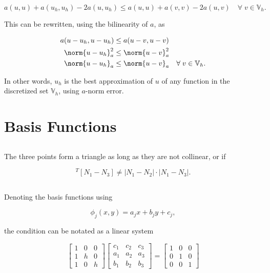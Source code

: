 \documentclass{hw-template}
\begin{document}
\begin{equation}
    a(u, u) + a(u_h, u_h) - 2a(u, u_h) \leq a(u, u) +  a(v, v) - 2a(u, v)\quad \forall\; v \in \mathbb{V}_h.
\end{equation}

This can be rewritten, using the bilinearity of $a$, as

\begin{align}
    a(u-u_h, u-u_h) &\leq a(u-v, u-v)\\
    \norm{u-u_h}_a^2 &\leq \norm{u-v}_a^2\\
    \norm{u-u_h}_a &\leq \norm{u-v}_a \quad \forall\; v \in \mathbb{V}_h.
\end{align}

In other words, $u_h$ is the best approximation of $u$ of any function in the discretized set $\mathbb{V}_h$, using $a$-norm error.

\section{Basis Functions}

\subsection{} The three points form a triangle as long as they are not collinear, or if 

\begin{equation}
    [N_1 - N_2]^T[N_1 - N_3] \neq |N_1 - N_2| \cdot |N_1 - N_3|.
\end{equation}

\subsection{}

Denoting the basis functions using

\begin{equation}
    \phi_j(x, y) = a_j x + b_j y + c_j,
\end{equation}

the condition can be notated as a linear system

\begin{equation}
    \begin{bmatrix}
        1 & 0 & 0\\
        1 & h & 0\\
        1 & 0 & h
    \end{bmatrix} \begin{bmatrix}
        c_1 & c_2 & c_3\\
        a_1 & a_2 & a_3\\
        b_1 & b_2 & b_3
    \end{bmatrix} = \begin{bmatrix}
        1 & 0 & 0\\
        0 & 1 & 0\\
        0 & 0 & 1
    \end{bmatrix}
\end{equation}
\end{document}

